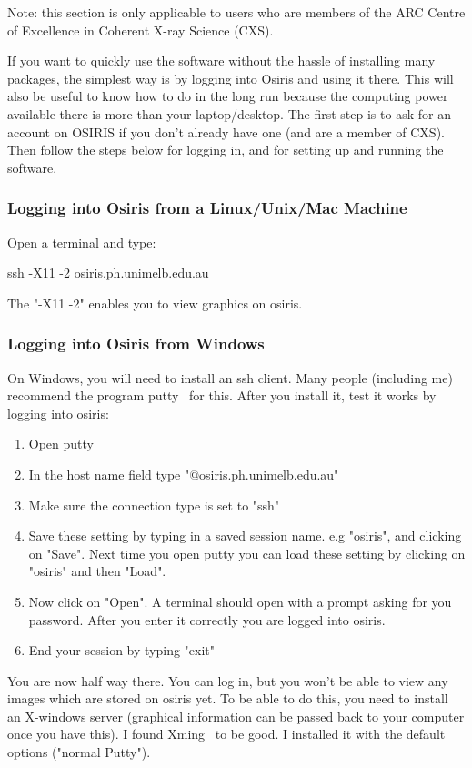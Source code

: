 \documentclass[]{cxs-software}
\begin{document}
Note: this section is only applicable to users who are members of
the ARC Centre of Excellence in Coherent X-ray Science (CXS).

If you want to quickly use the software without the hassle of
installing many packages, the simplest way is by logging into Osiris
and using it there. This will also be useful to know how to do in the
long run because the computing power available there is more than your
laptop/desktop. The first step is to ask for an account on OSIRIS if
you don't already have one (and are a member of CXS). Then follow the
steps below for logging in, and for setting up and running the
software.

\subsubsection{Logging into Osiris from a Linux/Unix/Mac Machine}

Open a terminal and type: 
\begin{myverbatim}
  ssh -X11 -2 osiris.ph.unimelb.edu.au 
\end{myverbatim}
The "-X11 -2" enables you to view graphics on osiris.

\subsubsection{Logging into Osiris from Windows}

On Windows, you will need to install an ssh client. Many people
(including me) recommend the program putty~\cite{} for this.  After
you install it, test it works by logging into osiris:
\begin{enumerate}
\item Open putty 
\item In the host name field type "@osiris.ph.unimelb.edu.au" 
\item Make sure the connection type is set to "ssh" 
\item Save these setting by typing in a saved session name. e.g
  "osiris", and clicking on "Save". Next time you open putty you can load
  these setting by clicking on "osiris" and then "Load".
\item Now click on "Open". A terminal should open with a prompt asking
  for you password. After you enter it correctly you are logged into
  osiris.
\item End your session by typing "exit"
\end{enumerate}

You are now half way there. You can log in, but you won't be able to
view any images which are stored on osiris yet. To be able to do this,
you need to install an X-windows server (graphical information can be
passed back to your computer once you have this). I found
Xming~\cite{} to be good. I installed it with the default options
("normal Putty").
\end{document}
